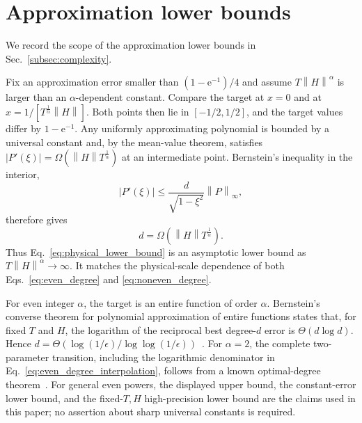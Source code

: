 \documentclass[aps,pra,reprint,floatfix,unsortedaddress,superscriptaddress]{revtex4-2}
\newcommand{\norm}[1]{\left\lVert#1\right\rVert}
\newcommand{\abs}[1]{\left\lvert#1\right\rvert}
\begin{document}
\section{Approximation lower bounds}
\label{app:optimality}

We record the scope of the approximation lower bounds in
Sec.~\ref{subsec:complexity}.

Fix an approximation error smaller than $(1-\mathrm e^{-1})/4$ and
assume $T\norm{H}^{\alpha}$ is larger than an
$\alpha$-dependent constant.  Compare the target at $x=0$ and at
$x=1/[T^{\frac{1}{\alpha}}\norm{H}]$.  Both points then lie in $[-1/2,1/2]$,
and the target values differ by $1-\mathrm e^{-1}$.  Any uniformly
approximating polynomial is bounded by a universal constant and, by
the mean-value theorem, satisfies
$\abs{P'(\xi)}=\Omega(\norm{H}T^{\frac{1}{\alpha}})$ at an intermediate
point.
Bernstein's inequality in the interior,
\begin{equation}
    \abs{P'(\xi)}
    \leq
    \frac{d}{\sqrt{1-\xi^2}}
    \norm{P}_\infty,
    \label{eq:bernstein_derivative}
\end{equation}
therefore gives
\begin{equation}
    d=\Omega(\norm{H}T^{\frac{1}{\alpha}}).
    \label{eq:physical_lower_bound}
\end{equation}
Thus Eq.~\eqref{eq:physical_lower_bound} is an asymptotic lower bound
as $T\norm{H}^{\alpha}\to\infty$.  It matches the physical-scale
dependence of both
Eqs.~\eqref{eq:even_degree} and
\eqref{eq:noneven_degree}.

For even integer $\alpha$, the target is an entire function of order
$\alpha$.  Bernstein's converse theorem for polynomial approximation
of entire functions states that, for fixed $T$ and $H$, the logarithm
of the reciprocal best degree-$d$ error is
$\Theta(d\log d)$.  Hence
$d=\Theta(
\log(1/\epsilon)/\log\log(1/\epsilon))$~\cite{bernstein1912ordre,
timan1963theory}.  For $\alpha=2$, the complete
two-parameter transition, including the logarithmic denominator in
    Eq.~\eqref{eq:even_degree_interpolation}, follows from a known
    optimal-degree theorem~\cite{aggarwal2022optimaldegree}.  For general even powers,
the displayed upper bound, the constant-error lower bound, and the
fixed-$T,H$ high-precision lower bound are the claims used in this
paper; no assertion about sharp universal constants is required.
\end{document}
